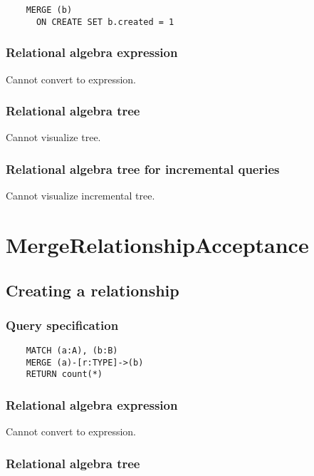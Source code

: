 	\begin{lstlisting}
	MERGE (b)
	  ON CREATE SET b.created = 1
	\end{lstlisting}


	\subsubsection*{Relational algebra expression}

	Cannot convert to expression.

	\subsubsection*{Relational algebra tree}

	Cannot visualize tree.

	\subsubsection*{Relational algebra tree for incremental queries}

	Cannot visualize incremental tree.

	\section{MergeRelationshipAcceptance}

	\subsection{Creating a relationship}

	\subsubsection*{Query specification}

	\begin{lstlisting}
	MATCH (a:A), (b:B)
	MERGE (a)-[r:TYPE]->(b)
	RETURN count(*)
	\end{lstlisting}


	\subsubsection*{Relational algebra expression}

	Cannot convert to expression.

	\subsubsection*{Relational algebra tree}

